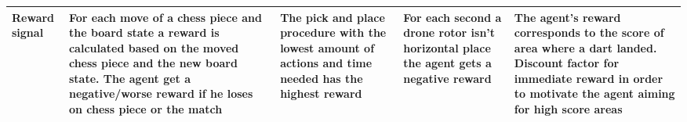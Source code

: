\documentclass[a4paper]{article}
\begin{document}
\begin{tabularx}{\textwidth} { 
    		 >{\centering}X 
    		| >{\raggedright}X 
    		| >{\raggedright\arraybackslash}X
    		| >{\raggedright\arraybackslash}X 
    		| >{\raggedright\arraybackslash}X}
    	\hline
    	\vspace{2pt} \textbf{Reward} signal  & \vspace{2pt} For each move of a chess piece and the board state a reward is calculated based on the moved chess piece and the new board state. The agent get a negative/worse reward if he loses on chess piece or the match & \vspace{2pt} The pick and place procedure with the lowest amount of actions and time needed has the highest reward & \vspace{2pt} For each second a drone rotor isn't horizontal place the agent gets a negative reward & \vspace{2pt} The agent's reward corresponds to the score of area where a dart landed. Discount factor for immediate reward in order to motivate the agent aiming for high score areas \\
    	\hline
    \end{tabularx}
    
\end{document}
